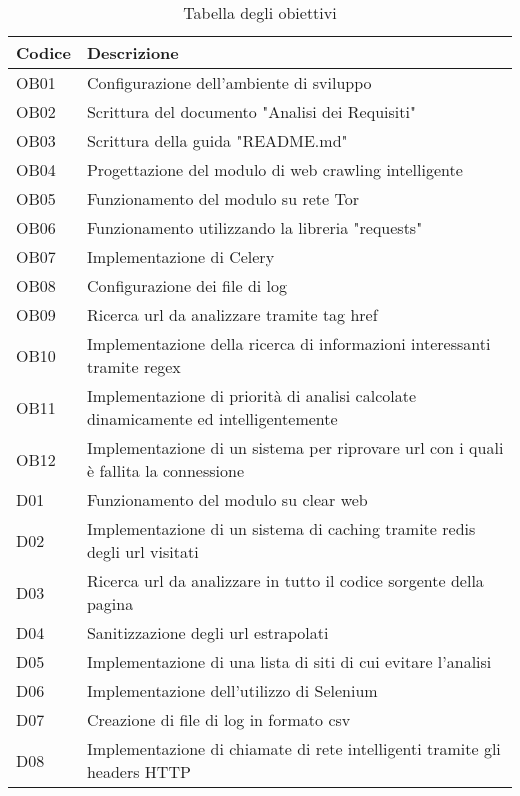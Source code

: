 \begin{longtable}{|p{}|p{}|}
	\caption{Tabella degli obiettivi}
	\label{tab:tabella-obiettivi} \\
	\hline
	\textbf{Codice}	&	\textbf{Descrizione} \\
    \hline
    OB01		&	Configurazione dell'ambiente di sviluppo \\  
	\hline
    OB02		&	Scrittura del documento "Analisi dei Requisiti" \\ 
	\hline
    OB03		&	Scrittura della guida "README.md" \\
    \hline
    OB04		&	Progettazione del modulo di web crawling intelligente \\
    \hline
    OB05		&	Funzionamento del modulo su rete Tor \\
    \hline
    OB06		&	Funzionamento utilizzando la libreria "requests" \\
    \hline
    OB07		&	Implementazione di Celery \\
    \hline
    OB08		&	Configurazione dei file di log \\
    \hline
    OB09		&	Ricerca url da analizzare tramite tag href \\
    \hline
    OB10		&	Implementazione della ricerca di informazioni interessanti tramite regex \\
    \hline
    OB11		&	Implementazione di priorità di analisi calcolate dinamicamente ed intelligentemente \\
    \hline
    OB12		&	Implementazione di un sistema per riprovare url con i quali è fallita la connessione \\
    \hline
    D01			&	Funzionamento del modulo su clear web \\
    \hline
    D02			&	Implementazione di un sistema di caching tramite redis degli url visitati \\
    \hline
    D03			&	Ricerca url da analizzare in tutto il codice sorgente della pagina \\
    \hline
    D04			&	Sanitizzazione degli url estrapolati \\
    \hline
    D05			&	Implementazione di una lista di siti di cui evitare l'analisi \\
    \hline 
    D06			&	Implementazione dell'utilizzo di Selenium \\
    \hline
    D07			&	Creazione di file di log in formato csv \\
    \hline
    D08			&	Implementazione di chiamate di rete intelligenti tramite gli headers HTTP \\

\end{longtable}
